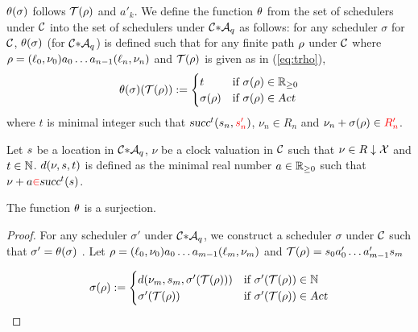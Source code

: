 $ \theta(\sigma) $ follows $ \mathcal{T}(\rho) $ and $ a'_k $.
We define the function $\theta$ from the set of schedulers under $\mathcal{C}$ into the set of schedulers under ${\mathcal{C}}{\ast}{\mathcal{A}_q}$ as follows: for any scheduler $\sigma$ for $\mathcal{C}$, $\theta(\sigma)$ (for ${\mathcal{C}}{\ast}{\mathcal{A}_q}$) is defined such that for any finite path $\rho$ under $\mathcal{C}$ where $\rho=(\ell_0,\nu_0)a_0\dots a_{n-1}(\ell_n,\nu_n)$ and $\mathcal{T}(\rho)$ is given as in (\ref{eq:trho}),
\[
\theta(\sigma)(\mathcal{T}(\rho)):=
    \begin{cases}
    t               & \mbox{if } \sigma(\rho) \in \mathbb{R}_{\ge0} \\
    \sigma(\rho) & \mbox{if } \sigma(\rho) \in \mbox{\sl Act}
    \end{cases}
\]
where $t$ is minimal integer such that $\mbox{\sl succ}^t(s_{n},{\color{red}s'_{n}})$, $ \nu_{n} \in R_{n} $ and 
$ \nu_{n} +  \sigma(\rho) \in {\color{red} R'_{n}} $.

\begin{definition}
Let $s$ be a location in ${\mathcal{C}}{\ast}{\mathcal{A}_q}$,  $\nu$ be a clock valuation in $\mathcal{C}$ such that $\nu \in {R} \downarrow {\mathcal{X}}$ and $t \in \mathbb{N}$. $d(\nu,s,t)$ 
is defined as the minimal real number $a \in \mathbb{R}_{\ge0}$ such that
$ \nu +  a {\color{red}\in}  \mbox{\sl succ}^t(s) $.

\end{definition}
\begin{lemma}
The function $\theta$ is a surjection.
\end{lemma}
\begin{proof}
For any scheduler $\sigma'$ under ${\mathcal{C}}{\ast}{\mathcal{A}_q}$, we construct a
scheduler $\sigma$ under $\mathcal{C}$ such that $\sigma' = \theta( \sigma )$ .
Let $\rho=(\ell_0,\nu_0)a_0\dots a_{m-1}(\ell_m,\nu_m)$ and 
$
    \mathcal{T}(\rho)
        =
        s_0
        a'_0
        \dots 
        a'_{m-1}
        s_{m}
$

\[
\sigma(\rho):=
    \begin{cases}
    d(\nu_m,s_m,\sigma'(\mathcal{T}(\rho)))
                    &   \mbox{if } \sigma'(\mathcal{T}(\rho)) \in \mathbb{N} \\ 
    \sigma'(\mathcal{T}(\rho))
                    &   \mbox{if } \sigma'(\mathcal{T}(\rho)) \in \mbox{\sl Act}
    \end{cases}
\]



\end{proof}

